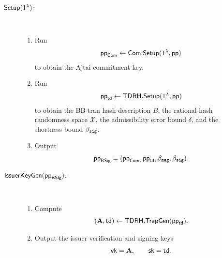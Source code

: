 \begin{description}
\item[$\mathsf{Setup}(1^\lambda)$:]~
\begin{enumerate}[leftmargin=1.25em]
  \item Run
  \[
    \mathsf{pp}_{\mathsf{Com}}\gets \mathsf{Com}.\mathsf{Setup}(1^\lambda,\mathsf{pp})
  \]
  to obtain the Ajtai commitment key.
  \item Run
  \[
    \mathsf{pp}_{\mathsf{td}}\gets \mathsf{TDRH}.\mathsf{Setup}(1^\lambda,\mathsf{pp})
  \]
  to obtain the BB-tran hash description $B$, the rational-hash randomness space $\mathcal X$, the admissibility
  error bound $\delta$, and the shortness bound $\beta_{\mathtt{sig}}$.
  \item Output
  \[
    \mathsf{pp}_{\mathsf{BSig}}=(\mathsf{pp}_{\mathsf{Com}},\mathsf{pp}_{\mathsf{td}},\beta_{\mathtt{msg}},\beta_{\mathtt{sig}}).
  \]
\end{enumerate}

\item[$\mathsf{IssuerKeyGen}(\mathsf{pp}_{\mathsf{BSig}})$:]~
\begin{enumerate}[leftmargin=1.25em]
  \item Compute
  \[
    (\mathbf{A},\mathsf{td})\gets \mathsf{TDRH}.\mathsf{TrapGen}(\mathsf{pp}_{\mathsf{td}}).
  \]
  \item Output the issuer verification and signing keys
  \[
    \mathsf{vk}=\mathbf{A},
    \qquad
    \mathsf{sk}=\mathsf{td}.
  \]
\end{enumerate}


\end{description}
